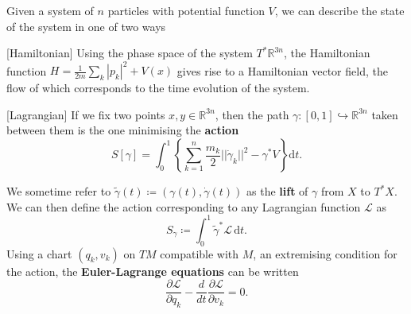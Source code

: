 \documentclass[11pt, final]{article}
\begin{document}
\begin{example}
	Given a system of $n$ particles with potential function $V$, we can describe the state of the system in one of two ways
		\begin{ronumerate}
			\item {[Hamiltonian]}\label{itm:Hamiltonian} Using the phase space of the system $T^*\mathbb{R}^{3n}$, the Hamiltonian function $H = \tfrac{1}{2m}\sum_k |p_k|^2 + V(x)$ gives rise to a Hamiltonian vector field, the flow of which corresponds to the time evolution of the system.
			\item \label{itm:Lagrangian }{[Lagrangian]} If we fix two points $x,y \in \mathbb{R}^{3n}$, then the path $\gamma: [0,1] \hookrightarrow \mathbb{R}^{3n}$ taken between them is the one minimising the \textbf{action}
				\begin{equation}
					S[\gamma] = \int_0^1 \left\{ \sum_{k=1}^n \frac{m_k}{2} || \dot{\gamma}_k ||^2 - \gamma^* V \right\} \mathrm{d}t.
				\end{equation}
		\end{ronumerate}
\end{example}
\begin{remark}
	We sometime refer to $\tilde{\gamma}(t) \coloneqq (\gamma(t),\dot{\gamma}(t))$ as the \textbf{lift} of $\gamma$ from $X$ to $T^*X$. We can then define the action corresponding to any Lagrangian function $\mathcal{L}$ as
		\begin{equation}
			S_\gamma \coloneqq \int_0^1 \tilde{\gamma}^* \mathcal{L} \, \mathrm{d}t.
		\end{equation}
	Using a chart $(q_k,v_k)$ on $TM$ compatible with $M$, an extremising condition for the action, the \textbf{Euler-Lagrange equations} can be written
		\begin{equation}
			\frac{\partial \mathcal{L}}{\partial q_k} - \frac{d}{dt}\frac{\partial \mathcal{L}}{\partial v_k} = 0.
		\end{equation}
\end{remark}
\end{document}
